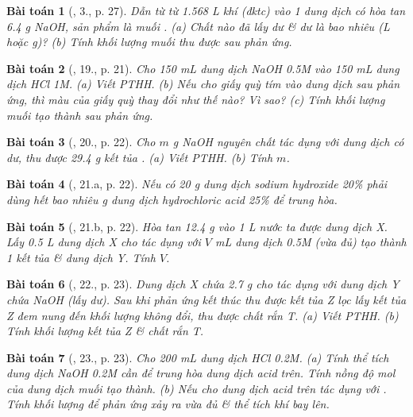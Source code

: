 \documentclass{article}
\newtheorem{baitoan}{Bài toán}
\begin{document}
\begin{baitoan}[\cite{SGK_Hoa_Hoc_9}, 3., p. 27]
	Dẫn từ từ \emph{1.568 L} khí \emph{} (đktc) vào 1 dung dịch có hòa tan \emph{6.4 g NaOH}, sản phẩm là muối \emph{}. (a) Chất nào đã lấy dư \& dư là bao nhiêu (\emph{L} hoặc \emph{g})? (b) Tính khối lượng muối thu được sau phản ứng.
\end{baitoan}

\begin{baitoan}[\cite{An_350_BT_Hoa_Hoc_9}, 19., p. 21]
	Cho \emph{150 mL} dung dịch \emph{NaOH 0.5M} vào \emph{150 mL} dung dịch \emph{HCl 1M}. (a) Viết PTHH. (b) Nếu cho giấy quỳ tím vào dung dịch sau phản ứng, thì màu của giấy quỳ thay đổi như thế nào? Vì sao? (c) Tính khối lượng muối tạo thành sau phản ứng.
\end{baitoan}

\begin{baitoan}[\cite{An_350_BT_Hoa_Hoc_9}, 20., p. 22]
	Cho $m$ \emph{g NaOH} nguyên chất tác dụng với dung dịch \emph{} có dư, thu được \emph{29.4 g} kết tủa \emph{}. (a) Viết PTHH. (b) Tính $m$.
\end{baitoan}

\begin{baitoan}[\cite{An_350_BT_Hoa_Hoc_9}, 21.a, p. 22]
	Nếu có \emph{20 g} dung dịch sodium hydroxide \emph{20\%} phải dùng hết bao nhiêu \emph{g} dung dịch hydrochloric acid \emph{25\%} để trung hòa.
\end{baitoan}

\begin{baitoan}[\cite{An_350_BT_Hoa_Hoc_9}, 21.b, p. 22]
	Hòa tan \emph{12.4 g } vào \emph{1 L} nước ta được dung dịch X. Lấy \emph{0.5 L} dung dịch X cho tác dụng với $V$ \emph{mL} dung dịch \emph{ 0.5M} (vừa đủ) tạo thành 1 kết tủa \& dung dịch Y. Tính $V$.
\end{baitoan}

\begin{baitoan}[\cite{An_350_BT_Hoa_Hoc_9}, 22., p. 23]
	Dung dịch X chứa \emph{2.7 g } cho tác dụng với dung dịch Y chứa \emph{NaOH} (lấy dư). Sau khi phản ứng kết thúc thu được kết tủa Z lọc lấy kết tủa Z đem nung đến khối lượng không đổi, thu được chất rắn T. (a) Viết PTHH. (b) Tính khối lượng kết tủa Z \& chất rắn T.
\end{baitoan}

\begin{baitoan}[\cite{An_350_BT_Hoa_Hoc_9}, 23., p. 23]
	Cho \emph{200 mL} dung dịch \emph{HCl 0.2M}. (a) Tính thể tích dung dịch \emph{NaOH 0.2M} cần để trung hòa dung dịch acid trên. Tính nồng độ mol của dung dịch muối tạo thành. (b) Nếu cho dung dịch acid trên tác dụng với \emph{}. Tính khối lượng \emph{} để phản ứng xảy ra vừa đủ \& thể tích khí bay lên.
\end{baitoan}
\end{document}
